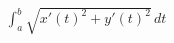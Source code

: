 \documentclass[preview]{standalone}
\begin{document}
\begin{align*}
\int_{a}^{b} \sqrt{x'(t)^2 + y'(t)^2} \, dt
\end{align*}
\end{document}
